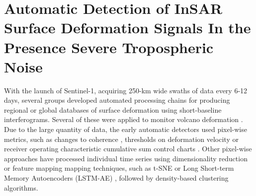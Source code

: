 
\chapter{Automatic Detection of InSAR Surface Deformation Signals In the Presence Severe Tropospheric Noise}





With the launch of Sentinel-1, acquiring 250-km wide swaths of data every 6-12 days, several groups developed automated processing chains for producing regional or global databases of surface deformation using short-baseline interferograms.
Several of these were applied to monitor volcano deformation \cite{Meyer2015IntegratingSarDerived, Valade2019TowardsGlobalVolcano, Lazecky2020LicsarAutomaticInsar}.
Due to the large quantity of data, the early automatic detectors used pixel-wise metrics, such as changes to coherence \cite{Meyer2015IntegratingSarDerived}, thresholds on deformation velocity \cite{Raspini2018ContinuousSemiAutomatic, Bekaert2020InsarBasedDetection} or receiver operating characteristic cumulative sum control charts \cite{Albino2020AutomatedMethodsDetecting}. Other pixel-wise approaches have processed individual time series using dimensionality reduction or feature mapping mapping techniques, such as t-SNE \cite{Kerkhof2020IndividualScattererModel} or Long Short-term Memory Autoencoders (LSTM-AE) \cite{Ansari2021InsarDisplacementTime}, followed by density-based clustering algorithms.

